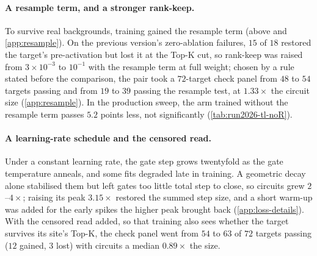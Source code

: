 \paragraph{A resample term, and a stronger rank-keep.}
To survive real backgrounds, training gained the resample term (above and \cref{app:resample}).
On the previous version's zero-ablation failures, $15$ of $18$ restored the target's pre-activation but lost it at the Top-K cut, so rank-keep was raised from $3 \times 10^{-3}$ to $10^{-1}$ with the resample term at full weight; chosen by a rule stated before the comparison, the pair took a $72$-target check panel from $48$ to $54$ targets passing and from $19$ to $39$ passing the resample test, at $1.33\times$ the circuit size (\cref{app:resample}).
In the production sweep, the arm trained without the resample term passes $5.2$ points less, not significantly (\cref{tab:run2026-tl-noR}).

\paragraph{A learning-rate schedule and the censored read.}
Under a constant learning rate, the gate step grows twentyfold as the gate temperature anneals, and some fits degraded late in training.
A geometric decay alone stabilised them but left gates too little total step to close, so circuits grew $2$--$4\times$; raising its peak $3.15\times$ restored the summed step size, and a short warm-up was added for the early spikes the higher peak brought back (\cref{app:loss-details}).
With the censored read added, so that training also sees whether the target survives its site's Top-K, the check panel went from $54$ to $63$ of $72$ targets passing ($12$ gained, $3$ lost) with circuits a median $0.89\times$ the size.

